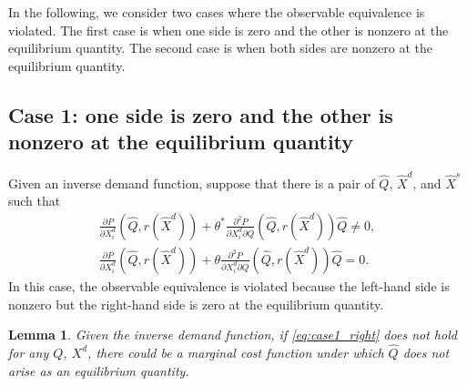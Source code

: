\documentclass[11pt, a4paper]{article}
\newtheorem{lemma}{Lemma}
\theoremstyle{remark}
\begin{document}
In the following, we consider two cases where the observable equivalence is violated.
The first case is when one side is zero and the other is nonzero at the equilibrium quantity.
The second case is when both sides are nonzero at the equilibrium quantity.

\subsection{Case 1: one side is zero and the other is nonzero at the equilibrium quantity}
Given an inverse demand function, suppose that there is a pair of $\hat{Q}$, $\hat{X}^{d}$, and $\hat{X}^{s}$ such that 
\begin{align}
    \frac{\partial P}{\partial X^{d}_i}(\hat{Q}, r(\hat{X}^{d})) + \theta^{*}\frac{\partial^2 P}{\partial X^{d}_{i}\partial Q}(\hat{Q}, r(\hat{X}^{d}))\hat{Q}  \ne 0,\label{eq:case1_left}\\
    \frac{\partial P}{\partial X^{d}_i}(\hat{Q}, r(\hat{X}^{d})) + \theta\frac{\partial^2 P}{\partial X^{d}_{i}\partial Q}(\hat{Q}, r(\hat{X}^{d}))\hat{Q}  = 0.\label{eq:case1_right}
\end{align}
In this case, the observable equivalence is violated because the left-hand side is nonzero but the right-hand side is zero at the equilibrium quantity.


\begin{lemma}
    Given the inverse demand function, if \eqref{eq:case1_right} does not hold for any $Q$, $X^{d}$, there could be a marginal cost function under which $\hat{Q}$ does not arise as an equilibrium quantity.
\end{lemma}
\end{document}
